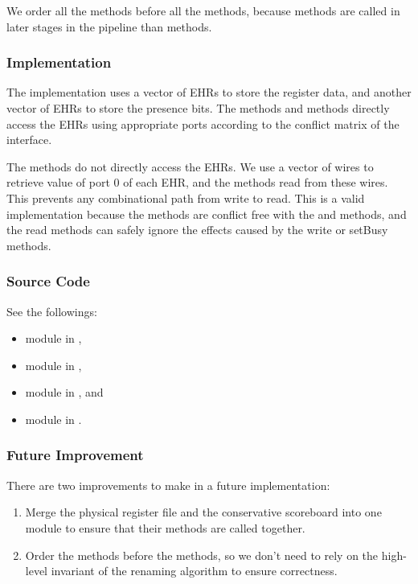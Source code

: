 We order all the  methods before all the  methods, because  methods are called in later stages in the pipeline than  methods.

\subsubsection{Implementation}
The implementation uses a vector of EHRs to store the register data, and another vector of EHRs to store the presence bits.
The  methods and  methods directly access the EHRs using appropriate ports according to the conflict matrix of the interface.

The  methods do not directly access the EHRs.
We use a vector of wires to retrieve value of port 0 of each EHR, and the  methods read from these wires.
This prevents any combinational path from write to read.
This is a valid implementation because the  methods are conflict free with the  and  methods, and the read methods can safely ignore the effects caused by the write or setBusy methods.

\subsubsection{Source Code}
See the followings:
\begin{itemize}
    \item module  in ,
    \item module  in ,
    \item module  in , and
    \item module  in .
\end{itemize}

\subsubsection{Future Improvement}
There are two improvements to make in a future implementation:
\begin{enumerate}
    \item Merge the physical register file and the conservative scoreboard into one module to ensure that their methods are called together.
    \item Order the  methods before the  methods, so we don't need to rely on the high-level invariant of the renaming algorithm to ensure correctness.
\end{enumerate}
